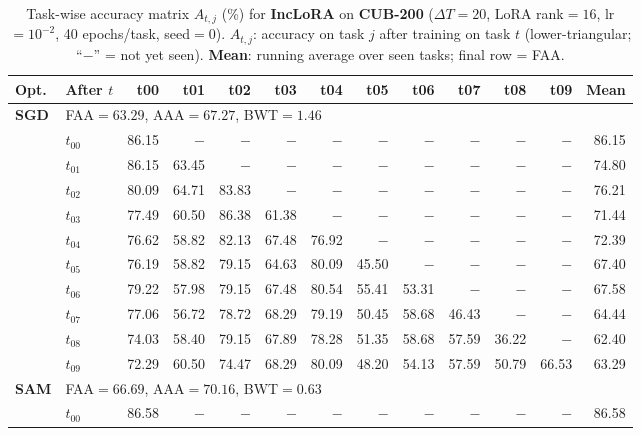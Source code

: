 \begin{table}[ht]
\centering
\caption{%
  Task-wise accuracy matrix $A_{t,j}$ (\%) for \textbf{IncLoRA} on \textbf{CUB-200} ($\Delta T=20$, LoRA rank$=16$, lr$=10^{-2}$, 40 epochs/task, seed$=0$).
  $A_{t,j}$: accuracy on task $j$ after training on task $t$  (lower-triangular; ``$-$'' = not yet seen).
  \textbf{Mean}: running average over seen tasks; final row = FAA.
}
\label{tab:raw_inclora_cub200}
\setlength{\tabcolsep}{2.8pt}
\renewcommand{\arraystretch}{0.88}
\scriptsize
\begin{tabular}{@{}l l r r r r r r r r r r r@{}}
\toprule
\textbf{Opt.} & \textbf{After $t$} & \textbf{t00} & \textbf{t01} & \textbf{t02} & \textbf{t03} & \textbf{t04} & \textbf{t05} & \textbf{t06} & \textbf{t07} & \textbf{t08} & \textbf{t09} & \textbf{Mean} \\
\midrule
\multirow{11}{*}{\textbf{SGD}} & \multicolumn{12}{l}{\quad\small FAA$=63.29$,\; AAA$=67.27$,\; BWT$=1.46$} \\
 & $t_{00}$ & 86.15 & $-$ & $-$ & $-$ & $-$ & $-$ & $-$ & $-$ & $-$ & $-$ & 86.15 \\
 & $t_{01}$ & 86.15 & 63.45 & $-$ & $-$ & $-$ & $-$ & $-$ & $-$ & $-$ & $-$ & 74.80 \\
 & $t_{02}$ & 80.09 & 64.71 & 83.83 & $-$ & $-$ & $-$ & $-$ & $-$ & $-$ & $-$ & 76.21 \\
 & $t_{03}$ & 77.49 & 60.50 & 86.38 & 61.38 & $-$ & $-$ & $-$ & $-$ & $-$ & $-$ & 71.44 \\
 & $t_{04}$ & 76.62 & 58.82 & 82.13 & 67.48 & 76.92 & $-$ & $-$ & $-$ & $-$ & $-$ & 72.39 \\
 & $t_{05}$ & 76.19 & 58.82 & 79.15 & 64.63 & 80.09 & 45.50 & $-$ & $-$ & $-$ & $-$ & 67.40 \\
 & $t_{06}$ & 79.22 & 57.98 & 79.15 & 67.48 & 80.54 & 55.41 & 53.31 & $-$ & $-$ & $-$ & 67.58 \\
 & $t_{07}$ & 77.06 & 56.72 & 78.72 & 68.29 & 79.19 & 50.45 & 58.68 & 46.43 & $-$ & $-$ & 64.44 \\
 & $t_{08}$ & 74.03 & 58.40 & 79.15 & 67.89 & 78.28 & 51.35 & 58.68 & 57.59 & 36.22 & $-$ & 62.40 \\
 & $t_{09}$ & 72.29 & 60.50 & 74.47 & 68.29 & 80.09 & 48.20 & 54.13 & 57.59 & 50.79 & 66.53 & 63.29 \\
\midrule
\multirow{11}{*}{\textbf{SAM}} & \multicolumn{12}{l}{\quad\small FAA$=66.69$,\; AAA$=70.16$,\; BWT$=0.63$} \\
 & $t_{00}$ & 86.58 & $-$ & $-$ & $-$ & $-$ & $-$ & $-$ & $-$ & $-$ & $-$ & 86.58 \\

\end{tabular}
\end{table}
